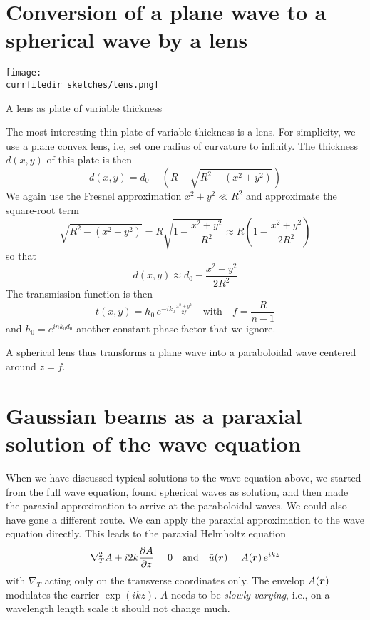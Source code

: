 \section{Conversion of a plane wave to a spherical wave by a lens}

\begin{marginfigure}
    \texttt{[image: \\currfiledir sketches/lens.png]}
   \caption{A lens as plate of variable thickness}
\end{marginfigure}

The most interesting thin plate of variable thickness is a lens. For simplicity, we use a plane convex lens, i.e, set one radius of curvature to infinity. The thickness $d(x,y)$ of this plate is then
\begin{equation}
    d(x,y) = d_0 - \left( R - \sqrt{R^2 - (x^2 + y^2)} \right)
\end{equation}
We again use the Fresnel approximation $x^2 + y^2 \ll R^2$ and approximate the square-root term
\begin{equation}
    \sqrt{R^2 - (x^2 + y^2)}  = R \sqrt{1- \frac{x^2 + y^2}{R^2}} 
    \approx R \left( 1 -  \frac{x^2 + y^2}{2 R^2} \right)
\end{equation}
so that 
\begin{equation}
    d(x,y) \approx d_0 -  \frac{x^2 + y^2}{2 R^2}
\end{equation}
The transmission function is then
\begin{equation}
    t(x,y)= h_0 \,  e^{-i k_0 \frac{x^2 + y^2}{2f}}
    \quad 
    \text{with} \quad
    f = \frac{R}{n-1}
\end{equation}
and $h_0 = e^{i n k_0 d_0}$ another constant phase factor that we ignore.

A spherical lens thus transforms a plane wave into a paraboloidal wave centered around $z=f$.


\section{Gaussian beams as a paraxial solution of the wave equation}

When we have discussed typical solutions to the wave equation above, we started from the full wave equation, found spherical waves as solution, and then made the paraxial approximation to arrive at the paraboloidal waves. We could also have gone a different route. We can apply the paraxial approximation to the wave equation directly. This leads to the paraxial Helmholtz equation
\begin{equation}
    \nabla_T^2 A + i 2k \frac{\partial A}{\partial z} = 0
    \quad 
    \text{and}
    \quad
    \tilde{u}(\boldsymbol{r}) = A(\boldsymbol{r}) \, e^{i k z}
\end{equation}
with $ \nabla_T$ acting only on the transverse coordinates only. The envelop $ A(\boldsymbol{r})$ modulates the carrier $\exp(i k z)$. $A$ needs to be \emph{slowly varying}, i.e., on a wavelength length scale it should not change much.


